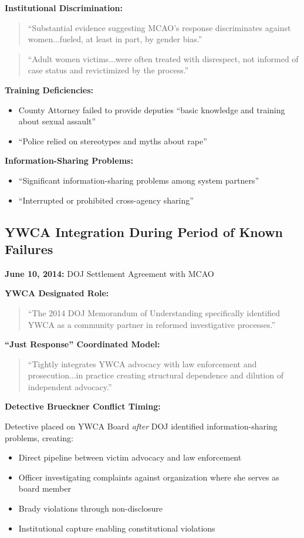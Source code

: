 \documentclass[11pt,letterpaper]{article}
\begin{document}
\textbf{Institutional Discrimination:}
\begin{quote}
``Substantial evidence suggesting MCAO's response discriminates against women...fueled, at least in part, by gender bias.''
\end{quote}

\begin{quote}
``Adult women victims...were often treated with disrespect, not informed of case status and revictimized by the process.''
\end{quote}

\textbf{Training Deficiencies:}
\begin{itemize}[leftmargin=*]
\item County Attorney failed to provide deputies ``basic knowledge and training about sexual assault''
\item ``Police relied on stereotypes and myths about rape''
\end{itemize}

\textbf{Information-Sharing Problems:}
\begin{itemize}[leftmargin=*]
\item ``Significant information-sharing problems among system partners''
\item ``Interrupted or prohibited cross-agency sharing''
\end{itemize}

\subsection{YWCA Integration During Period of Known Failures}

\textbf{June 10, 2014:} DOJ Settlement Agreement with MCAO

\textbf{YWCA Designated Role:}
\begin{quote}
``The 2014 DOJ Memorandum of Understanding specifically identified YWCA as a community partner in reformed investigative processes.''
\end{quote}

\textbf{``Just Response'' Coordinated Model:}
\begin{quote}
``Tightly integrates YWCA advocacy with law enforcement and prosecution...in practice creating structural dependence and dilution of independent advocacy.''
\end{quote}

\textbf{Detective Brueckner Conflict Timing:}

Detective placed on YWCA Board \textit{after} DOJ identified information-sharing problems, creating:
\begin{itemize}[leftmargin=*]
\item Direct pipeline between victim advocacy and law enforcement
\item Officer investigating complaints against organization where she serves as board member
\item Brady violations through non-disclosure
\item Institutional capture enabling constitutional violations
\end{itemize}
\end{document}
